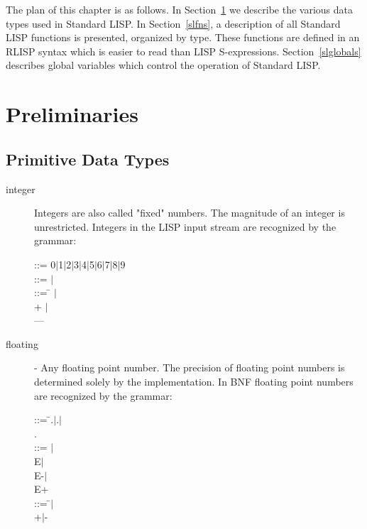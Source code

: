 The plan of this chapter is as follows. In Section~\ref{dtypes} we
describe the various data types used in Standard LISP. In
Section~\ref{slfns}, a description of all Standard LISP functions is
presented, organized by type. These functions are defined in an RLISP
syntax which is easier to read than LISP S-expressions.
Section~\ref{slglobals} describes global variables which control the
operation of Standard LISP.


\section{Preliminaries}
\label{dtypes}
\subsection{Primitive Data Types}
\label{pdat}
\begin{description}
\item[integer] Integers are also called "fixed" numbers. The magnitude of
an integer is unrestricted. Integers in the LISP input stream are
 
recognized by the grammar:

\begin{tabbing}
 ::= 0$\mid$1$\mid$2$\mid$3$\mid$4$\mid$5$\mid$6$\mid$7$\mid$8$\mid$9
\\
 ::= $\mid$ \\
 ::= \=  $\mid$ \\
\> + $\mid$ \\
\> ---
\end{tabbing}

\item[floating] - Any floating point number. The precision of floating point
numbers is determined solely by the implementation. In BNF floating
point numbers are recognized by the grammar:

\begin{tabbing}
 ::=  \= .$\mid$.$\mid$ \\
\> . \\
\>  ::= $\mid$ \\
\> E$\mid$ \\
\> E-$\mid$ \\
\> E+ \\
 ::= \= $\mid$ \\
\> +$\mid$-
\end{tabbing}


\end{description}
